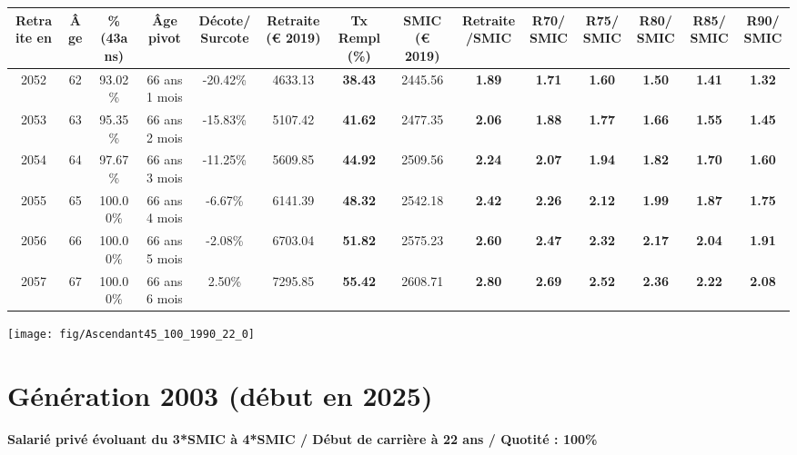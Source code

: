 \begin{adjustbox}{max width=\textwidth} 
\begin{tabular}[htb]{|c|c||c|c|c||c|c||c|c||c|c|c|c|c|} 
\hline 
 Retraite en &  Âge &  \%(43ans) &  Âge pivot &  Décote/Surcote &  Retraite (\euro{} 2019) &  Tx Rempl(\%) &  SMIC (\euro{} 2019) &  Retraite/SMIC &  R70/SMIC &  R75/SMIC &  R80/SMIC &  R85/SMIC &  R90/SMIC \\ 
\hline \hline 
 2052 &  62 &  93.02\% &  66 ans 1 mois &  -20.42\% &  4633.13 &  {\bf 38.43} &  2445.56 &  {\bf 1.89} &  {\bf 1.71} &  {\bf 1.60} &  {\bf 1.50} &  {\bf 1.41} &  {\bf 1.32} \\ 
\hline 
 2053 &  63 &  95.35\% &  66 ans 2 mois &  -15.83\% &  5107.42 &  {\bf 41.62} &  2477.35 &  {\bf 2.06} &  {\bf 1.88} &  {\bf 1.77} &  {\bf 1.66} &  {\bf 1.55} &  {\bf 1.45} \\ 
\hline 
 2054 &  64 &  97.67\% &  66 ans 3 mois &  -11.25\% &  5609.85 &  {\bf 44.92} &  2509.56 &  {\bf 2.24} &  {\bf 2.07} &  {\bf 1.94} &  {\bf 1.82} &  {\bf 1.70} &  {\bf 1.60} \\ 
\hline 
 2055 &  65 &  100.00\% &  66 ans 4 mois &  -6.67\% &  6141.39 &  {\bf 48.32} &  2542.18 &  {\bf 2.42} &  {\bf 2.26} &  {\bf 2.12} &  {\bf 1.99} &  {\bf 1.87} &  {\bf 1.75} \\ 
\hline 
 2056 &  66 &  100.00\% &  66 ans 5 mois &  -2.08\% &  6703.04 &  {\bf 51.82} &  2575.23 &  {\bf 2.60} &  {\bf 2.47} &  {\bf 2.32} &  {\bf 2.17} &  {\bf 2.04} &  {\bf 1.91} \\ 
\hline 
 2057 &  67 &  100.00\% &  66 ans 6 mois &  2.50\% &  7295.85 &  {\bf 55.42} &  2608.71 &  {\bf 2.80} &  {\bf 2.69} &  {\bf 2.52} &  {\bf 2.36} &  {\bf 2.22} &  {\bf 2.08} \\ 
\hline 
\hline 
\end{tabular} 
\end{adjustbox} 
 
 \vspace{0.1cm} 

 {\hspace{-2.2cm}\texttt{[image: fig/Ascendant45\_100\_1990\_22\_0]}} 

\newpage 
 
\section{Génération 2003 (début en 2025)\label{Ascendant45_100_2003_22_0}} 
 
{\bf \noindent Salarié privé évoluant du 3*SMIC à 4*SMIC / Début de carrière à 22 ans / Quotité : 100\%}  ~ 

